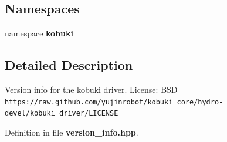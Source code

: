 \subsection*{\-Namespaces}
\begin{DoxyCompactItemize}
\item 
namespace {\bf kobuki}
\end{DoxyCompactItemize}


\subsection{\-Detailed \-Description}
\-Version info for the kobuki driver. \-License\-: \-B\-S\-D {\tt https\-://raw.\-github.\-com/yujinrobot/kobuki\-\_\-core/hydro-\/devel/kobuki\-\_\-driver/\-L\-I\-C\-E\-N\-S\-E} 

\-Definition in file {\bf version\-\_\-info.\-hpp}.

